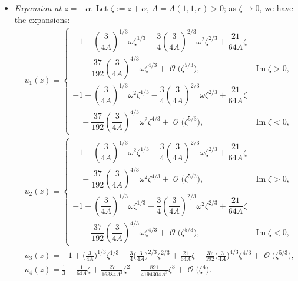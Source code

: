 \documentclass[pdftex]{sigma}
\DeclareMathOperator{\OO}{\mathcal{O}}
\numberwithin{equation}{section}
\begin{document}
\begin{itemize}
\begin{align*}
\begin{cases}
 \quad{}+ \dfrac{37}{192}\left(\dfrac{3}{4A}\right)^{4/3}\omega^2\zeta^{4/3} + \OO\bigl(\zeta^{5/3}\bigr), & \operatorname{Im}\zeta <0.
 \end{cases}
 \end{align*}
 \item \textit{Expansion at $z= -\alpha$}. Let $\zeta:=z+\alpha$, $A= A(1,1,c)>0$; as $\zeta\to 0$, we have the expansions:
 \begin{align*}
 &u_1(z) =
 \begin{cases}
 -1+ \left(\dfrac{3}{4A}\right)^{1/3}\omega\zeta^{1/3} - \dfrac{3}{4}\left(\dfrac{3}{4A}\right)^{2/3}\omega^2\zeta^{2/3}+ \dfrac{21}{64A}\zeta &\\
 \quad{} - \dfrac{37}{192}\left(\dfrac{3}{4A}\right)^{4/3}\omega\zeta^{4/3} + \OO\bigl(\zeta^{5/3}\bigr), & \operatorname{Im} \zeta >0,\\[1mm]
 -1+ \left(\dfrac{3}{4A}\right)^{1/3}\omega^2\zeta^{1/3} - \dfrac{3}{4}\left(\dfrac{3}{4A}\right)^{2/3}\omega\zeta^{2/3}+ \dfrac{21}{64A}\zeta &\\
 \quad{} - \dfrac{37}{192}\left(\dfrac{3}{4A}\right)^{4/3}\omega^2\zeta^{4/3} + \OO\bigl(\zeta^{5/3}\bigr), & \operatorname{Im} \zeta <0,
 \end{cases}\\
 &u_2(z) =
 \begin{cases}
 -1+ \left(\dfrac{3}{4A}\right)^{1/3}\omega^2\zeta^{1/3} - \dfrac{3}{4}\left(\dfrac{3}{4A}\right)^{2/3}\omega\zeta^{2/3}+ \dfrac{21}{64A}\zeta &\\
 \quad{} - \dfrac{37}{192}\left(\dfrac{3}{4A}\right)^{4/3}\omega^2\zeta^{4/3} + \OO\bigl(\zeta^{5/3}\bigr),
 & \operatorname{Im} \zeta >0,\\[1mm]
 -1+ \left(\dfrac{3}{4A}\right)^{1/3}\omega\zeta^{1/3} - \dfrac{3}{4}\left(\dfrac{3}{4A}\right)^{2/3}\omega^2\zeta^{2/3}+ \dfrac{21}{64A}\zeta &\\
 \quad{}- \dfrac{37}{192}\left(\dfrac{3}{4A}\right)^{4/3}\omega\zeta^{4/3} + \OO\bigl(\zeta^{5/3}\bigr), & \operatorname{Im} \zeta <0,
 \end{cases}\\
 &u_3(z) = -1+ \biggl(\frac{3}{4A}\biggr)^{1/3}\! \zeta^{1/3}\! - \frac{3}{4}\biggl(\frac{3}{4A}\biggr)^{2/3}\! \zeta^{2/3}\! + \frac{21}{64A} \zeta - \frac{37}{192}\biggl(\frac{3}{4A}\biggr)^{4/3}\zeta^{4/3}\! + \OO\bigl(\zeta^{5/3}\bigr),\\
 &u_4(z) = \frac{1}{3} + \frac{1}{64A}\zeta + \frac{27}{16384A^2}\zeta^2 + \frac{891}{4194304A^3}\zeta^3 + \OO\bigl(\zeta^4\bigr).
 \end{align*}
\end{itemize}
\end{document}
